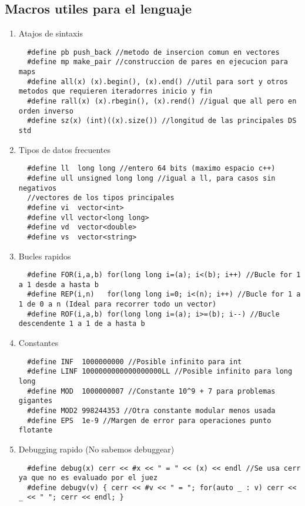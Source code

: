 \documentclass[11pt,a4paper]{article}
\begin{document}
\subsection{Macros utiles para el lenguaje}
\begin{enumerate} [label=\alph*.]
  \item Atajos de sintaxis
\begin{lstlisting}
  #define pb push_back //metodo de insercion comun en vectores
  #define mp make_pair //construccion de pares en ejecucion para maps
  #define all(x) (x).begin(), (x).end() //util para sort y otros metodos que requieren iteradorres inicio y fin
  #define rall(x) (x).rbegin(), (x).rend() //igual que all pero en orden inverso
  #define sz(x) (int)((x).size()) //longitud de las principales DS std
\end{lstlisting}
  \item Tipos de datos frecuentes
\begin{lstlisting}
  #define ll  long long //entero 64 bits (maximo espacio c++)
  #define ull unsigned long long //igual a ll, para casos sin negativos
  //vectores de los tipos principales
  #define vi  vector<int>
  #define vll vector<long long>
  #define vd  vector<double>
  #define vs  vector<string>
\end{lstlisting}
  \item Bucles rapidos
\begin{lstlisting}
  #define FOR(i,a,b) for(long long i=(a); i<(b); i++) //Bucle for 1 a 1 desde a hasta b
  #define REP(i,n)   for(long long i=0; i<(n); i++) //Bucle for 1 a 1 de 0 a n (Ideal para recorrer todo un vector)
  #define ROF(i,a,b) for(long long i=(a); i>=(b); i--) //Bucle descendente 1 a 1 de a hasta b
\end{lstlisting}
  \item Constantes
\begin{lstlisting}
  #define INF  1000000000 //Posible infinito para int 
  #define LINF 1000000000000000000LL //Posible infinito para long long
  #define MOD  1000000007 //Constante 10^9 + 7 para problemas gigantes
  #define MOD2 998244353 //Otra constante modular menos usada
  #define EPS  1e-9 //Margen de error para operaciones punto flotante
\end{lstlisting}
  \item Debugging rapido (No sabemos debuggear)
\begin{lstlisting}
  #define debug(x) cerr << #x << " = " << (x) << endl //Se usa cerr ya que no es evaluado por el juez
  #define debugv(v) { cerr << #v << " = "; for(auto _ : v) cerr << _ << " "; cerr << endl; }

\end{lstlisting}
\end{enumerate}
\end{document}
